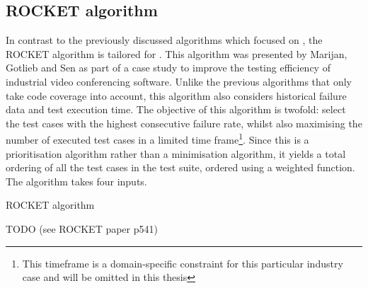 
\subsection{ROCKET algorithm}
\label{ssec:alg-rocket}
In contrast to the previously discussed algorithms which focused on \tsm{}, the ROCKET algorithm is tailored for \tcp{}. This algorithm was presented by Marijan, Gotlieb and Sen \cite{6676952} as part of a case study to improve the testing efficiency of industrial video conferencing software. Unlike the previous algorithms that only take code coverage into account, this algorithm also considers historical failure data and test execution time. The objective of this algorithm is twofold: select the test cases with the highest consecutive failure rate, whilst also maximising the number of executed test cases in a limited time frame\footnote{This timeframe is a domain-specific constraint for this particular industry case and will be omitted in this thesis}. Since this is a prioritisation algorithm rather than a minimisation algorithm, it yields a total ordering of all the test cases in the test suite, ordered using a weighted function.\\

The algorithm takes four inputs. 

\begin{algorithm}[h!]
\caption{ROCKET algorithm}
\label{alg:rocket}
\begin{algorithmic}[1]
	\State TODO (see ROCKET paper p541)
\end{algorithmic}
\end{algorithm}
